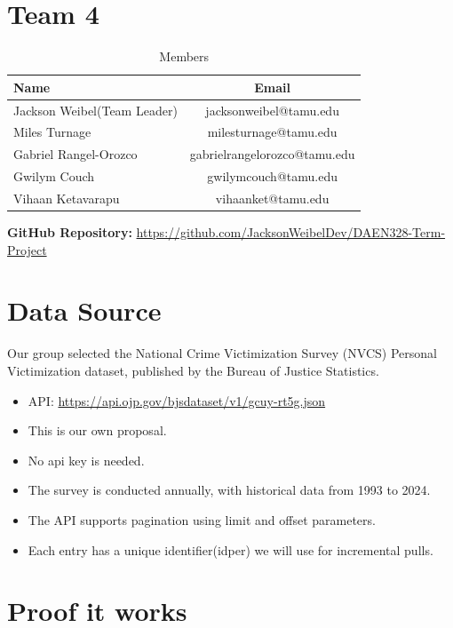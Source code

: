 \documentclass{article}
\begin{document}
\section{Team 4}
\begin{table}[htbp]
  \centering
  \caption{Members}
  \label{tab:team_table}
  \begin{tabular}{| l | c |}
    \hline
    \textbf{Name} & \textbf{Email} \\ \hline
    Jackson Weibel(Team Leader)            & jacksonweibel@tamu.edu                  \\ \hline
    Miles Turnage         & milesturnage@tamu.edu                     \\ \hline
    Gabriel Rangel-Orozco         & gabrielrangelorozco@tamu.edu                     \\ \hline
    Gwilym Couch         & gwilymcouch@tamu.edu                     \\ \hline
    Vihaan Ketavarapu         & vihaanket@tamu.edu                     \\ \hline
  \end{tabular}
\end{table}

\noindent
\textbf{GitHub Repository:}
\url{https://github.com/JacksonWeibelDev/DAEN328-Term-Project}


\section{Data Source}
Our group selected the National Crime Victimization Survey (NVCS) Personal Victimization dataset, published by the Bureau of Justice Statistics.

\begin{itemize}
  \item API: 
  \url{https://api.ojp.gov/bjsdataset/v1/gcuy-rt5g.json}

  \item This is our own proposal.
  \item No api key is needed.
  \item The survey is conducted annually, with historical data from 1993 to 2024.
  \item The API supports pagination using limit and offset parameters.
  \item Each entry has a unique identifier(idper) we will use for incremental pulls.
\end{itemize}

\section{Proof it works}
\end{document}
